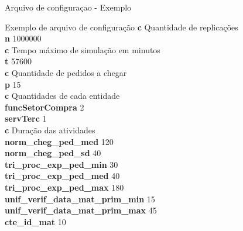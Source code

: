 \documentclass[xcolor=dvipsnames]{beamer}
\begin{document}
\begin{frame}{Arquivo de configuraçao - Exemplo}
	\begin{block}{Exemplo de arquivo de configuração}
		{\footnotesize
			{\color{red} \textbf{c} Quantidade de replicações}\\
			\textbf{n} 1000000\\
			{\color{red} \textbf{c} Tempo máximo de simulação em minutos}\\
			\textbf{t} 57600\\
			{\color{red} \textbf{c} Quantidade de pedidos a chegar}\\
			\textbf{p} 15\\
			{\color{red} \textbf{c} Quantidades de cada entidade }\\
			\textbf{funcSetorCompra} 2\\
			\textbf{servTerc} 1\\
			{\color{red} \textbf{c} Duração das atividades }\\
			\textbf{norm\_cheg\_ped\_med} 120\\
			\textbf{norm\_cheg\_ped\_sd} 40\\
						
			\textbf{tri\_proc\_exp\_ped\_min} 30\\
			\textbf{tri\_proc\_exp\_ped\_med} 40\\
			\textbf{tri\_proc\_exp\_ped\_max} 180\\
						
			\textbf{unif\_verif\_data\_mat\_prim\_min} 15\\
			\textbf{unif\_verif\_data\_mat\_prim\_max} 45\\
						
			\textbf{cte\_id\_mat} 10
		}
	\end{block}
\end{frame}
	
\end{document}
